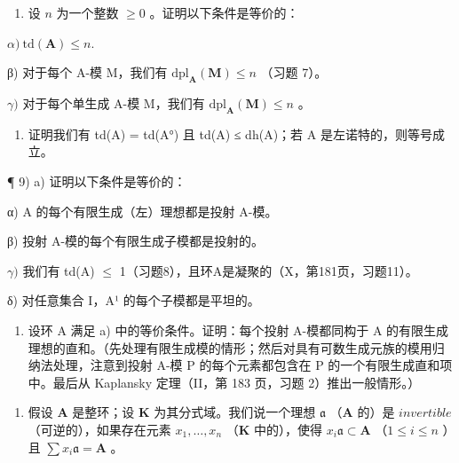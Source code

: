 \begin{enumerate}
\def\labelenumi{\alph{enumi})}
\tightlist
\item
  设 \(n\) 为一个整数 \(\geqslant 0\) 。证明以下条件是等价的：
\end{enumerate}

\(\alpha)\ \mathrm{td}(\mathbf{A}) \leqslant n.\)

β) 对于每个 A-模 M，我们有 \(\mathrm{dpl}_{\mathbf{A}}(\mathbf{M}) \leqslant n\) （习题 7）。

\(\gamma)\) 对于每个单生成 A-模 M，我们有 \(\mathrm{dpl}_{\mathbf{A}}(\mathbf{M}) \leqslant n\) 。

\begin{enumerate}
\def\labelenumi{\alph{enumi})}
\setcounter{enumi}{1}
\tightlist
\item
  证明我们有 td(A) = td(A°) 且 td(A) ≤ dh(A)；若 A 是左诺特的，则等号成立。
\end{enumerate}

¶ 9) a) 证明以下条件是等价的：

α) A 的每个有限生成（左）理想都是投射 A-模。

β) 投射 A-模的每个有限生成子模都是投射的。

\(\gamma)\) 我们有 td(A) \(\leqslant\) 1（习题8），且环A是凝聚的（X，第181页，习题11）。

δ) 对任意集合 I，A¹ 的每个子模都是平坦的。

\begin{enumerate}
\def\labelenumi{\alph{enumi})}
\setcounter{enumi}{1}
\tightlist
\item
  设环 A 满足 a) 中的等价条件。证明：每个投射 A-模都同构于 A 的有限生成理想的直和。（先处理有限生成模的情形；然后对具有可数生成元族的模用归纳法处理，注意到投射 A-模 P 的每个元素都包含在 P 的一个有限生成直和项中。最后从 Kaplansky 定理（II，第 183 页，习题 2）推出一般情形。）
\end{enumerate}

\begin{enumerate}
\def\labelenumi{\arabic{enumi})}
\setcounter{enumi}{9}
\tightlist
\item
  假设 \(\mathbf{A}\) 是整环；设 \(\mathbf{K}\) 为其分式域。我们说一个理想 \(\mathfrak{a}\) （\(\mathbf{A}\) 的）是 \(invertible\) （可逆的），如果存在元素 \(x_{1},\ldots ,x_{n}\) （\(\mathbf{K}\) 中的），使得 \(x_{i}\mathfrak{a}\subset \mathbf{A}\) （\(1\leqslant i\leqslant n\) ）且 \(\sum x_i\mathfrak{a} = \mathbf{A}\) 。
\end{enumerate}

